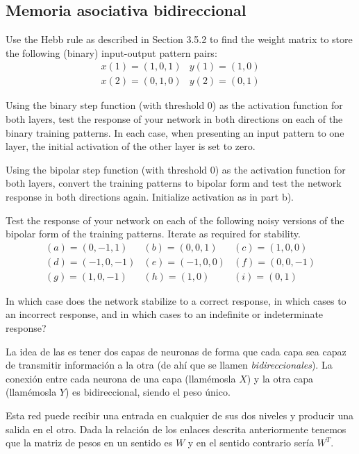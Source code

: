 \subsection{Memoria asociativa bidireccional}\label{sec:MemoriaAsociativaBidireccional}

\begin{problem}[10]
\ppart Use the Hebb rule as described in Section 3.5.2 to find the weight matrix to store
the following (binary) input-output pattern pairs:
\[\begin{array}{ll}
x(1)=(1,0,1) & y(1)=(1,0)\\
x(2) = (0,1,0) & y(2) = (0,1)
\end{array}\]

\ppart Using the binary step function (with threshold 0) as the activation function for both layers, test the response of your network in both directions on each of the
binary training patterns. In each case, when presenting an input pattern to one
layer, the initial activation of the other layer is set to zero.

\ppart Using the bipolar step function (with threshold 0) as the activation function for both layers, convert the training patterns to bipolar form and test the network response in both directions again. Initialize activation as in part b).

\ppart Test the response of your network on each of the following noisy versions of the bipolar form of the training patterns. Iterate as required for stability.
\[\begin{array}{lll}
(a)=(0,-1,1) & (b)=(0,0,1) & (c) = (1,0,0)\\
(d)=(-1,0,-1) & (e) = (-1,0,0) & (f) = (0,0,-1) \\
(g) = (1,0,-1) & (h)=(1,0) & (i) = (0,1)
\end{array}\]

\ppart  In which case does the network stabilize to a correct response, in which cases to an incorrect response, and in which cases to an indefinite or indeterminate response?

\solution

La idea de las  es tener dos capas de neuronas de forma que cada capa sea capaz de transmitir información a la otra (de ahí que se llamen \emph{bidireccionales}). La conexión entre cada neurona de una capa (llamémosla $X$) y la otra capa (llamémosla $Y$) es bidireccional, siendo el peso único.

Esta red puede recibir una entrada en cualquier de sus dos niveles y producir una salida en el otro. Dada la relación de los enlaces descrita anteriormente tenemos que la matriz de pesos en un sentido es $W$ y en el sentido contrario sería $W^T$.


\end{problem}
